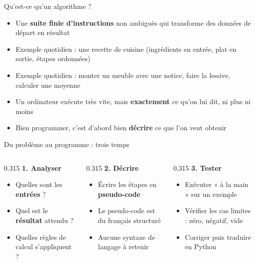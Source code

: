 \documentclass[aspectratio=169,11pt]{beamer}
\begin{document}
\begin{frame}{Qu'est-ce qu'un algorithme ?}
\begin{itemize}
  \item Une \textbf{suite finie d'instructions} non ambiguës qui transforme des données de départ en résultat
  \item Exemple quotidien : une recette de cuisine (ingrédients en entrée, plat en sortie, étapes ordonnées)
  \item Exemple quotidien : monter un meuble avec une notice, faire la lessive, calculer une moyenne
  \item Un ordinateur exécute très vite, mais \textbf{exactement} ce qu'on lui dit, ni plus ni moins
  \item Bien programmer, c'est d'abord bien \textbf{décrire} ce que l'on veut obtenir
\end{itemize}
\end{frame}

\begin{frame}{Du problème au programme : trois temps}
\begin{columns}[t]
\begin{column}{0.315\textwidth}
{\bfseries\color{PyBleu}1. Analyser}

\begin{itemize}
  \setlength{\itemsep}{1.5pt}\setlength{\parskip}{0pt}
  \item Quelles sont les \textbf{entrées} ?
  \item Quel est le \textbf{résultat} attendu ?
  \item Quelles règles de calcul s'appliquent ?
\end{itemize}
\end{column}
\hspace{0.015\textwidth}
\begin{column}{0.315\textwidth}
{\bfseries\color{PyBleu}2. Décrire}

\begin{itemize}
  \setlength{\itemsep}{1.5pt}\setlength{\parskip}{0pt}
  \item Écrire les étapes en \textbf{pseudo-code}
  \item Le pseudo-code est du français structuré
  \item Aucune syntaxe de langage à retenir
\end{itemize}
\end{column}
\hspace{0.015\textwidth}
\begin{column}{0.315\textwidth}
{\bfseries\color{PyBleu}3. Tester}

\begin{itemize}
  \setlength{\itemsep}{1.5pt}\setlength{\parskip}{0pt}
  \item Exécuter « à la main » sur un exemple
  \item Vérifier les cas limites : zéro, négatif, vide
  \item Corriger puis traduire en Python
\end{itemize}
\end{column}
\end{columns}
\end{frame}
\end{document}
